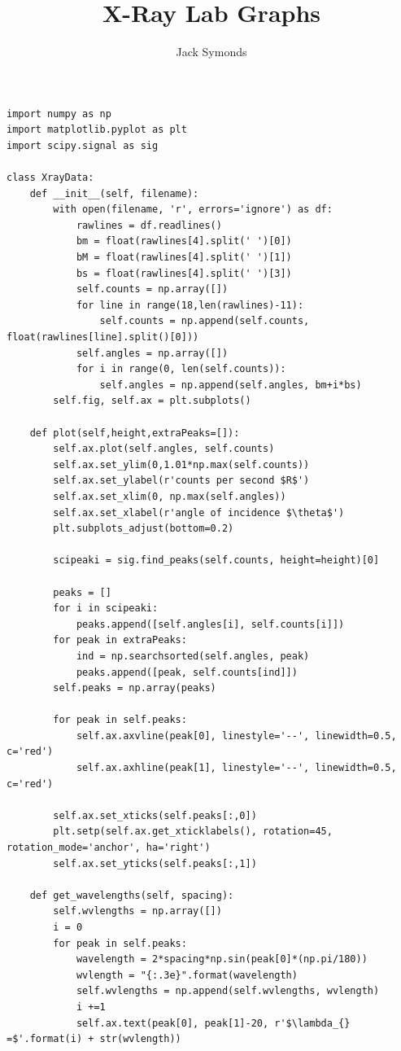 \documentclass[8pt, a4paper]{article}
\title{X-Ray Lab Graphs}
\author{Jack Symonds}
\date{}
\begin{document}
\maketitle
\begin{verbatim}
import numpy as np
import matplotlib.pyplot as plt
import scipy.signal as sig

class XrayData:
    def __init__(self, filename):
        with open(filename, 'r', errors='ignore') as df:
            rawlines = df.readlines()
            bm = float(rawlines[4].split(' ')[0])
            bM = float(rawlines[4].split(' ')[1])
            bs = float(rawlines[4].split(' ')[3])
            self.counts = np.array([])
            for line in range(18,len(rawlines)-11):
                self.counts = np.append(self.counts, float(rawlines[line].split()[0]))
            self.angles = np.array([])
            for i in range(0, len(self.counts)):
                self.angles = np.append(self.angles, bm+i*bs)
        self.fig, self.ax = plt.subplots()
        
    def plot(self,height,extraPeaks=[]):
        self.ax.plot(self.angles, self.counts)
        self.ax.set_ylim(0,1.01*np.max(self.counts))
        self.ax.set_ylabel(r'counts per second $R$')
        self.ax.set_xlim(0, np.max(self.angles))
        self.ax.set_xlabel(r'angle of incidence $\theta$')
        plt.subplots_adjust(bottom=0.2)

        scipeaki = sig.find_peaks(self.counts, height=height)[0]

        peaks = []
        for i in scipeaki:
            peaks.append([self.angles[i], self.counts[i]])
        for peak in extraPeaks:
            ind = np.searchsorted(self.angles, peak)
            peaks.append([peak, self.counts[ind]])
        self.peaks = np.array(peaks)

        for peak in self.peaks:
            self.ax.axvline(peak[0], linestyle='--', linewidth=0.5, c='red')
            self.ax.axhline(peak[1], linestyle='--', linewidth=0.5, c='red')

        self.ax.set_xticks(self.peaks[:,0])
        plt.setp(self.ax.get_xticklabels(), rotation=45, rotation_mode='anchor', ha='right')
        self.ax.set_yticks(self.peaks[:,1])

    def get_wavelengths(self, spacing):
        self.wvlengths = np.array([])
        i = 0
        for peak in self.peaks:
            wavelength = 2*spacing*np.sin(peak[0]*(np.pi/180))
            wvlength = "{:.3e}".format(wavelength)
            self.wvlengths = np.append(self.wvlengths, wvlength)
            i +=1
            self.ax.text(peak[0], peak[1]-20, r'$\lambda_{} =$'.format(i) + str(wvlength))
        



\end{verbatim}
\end{document}

